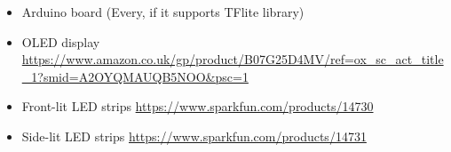 \documentclass{article}
\begin{document}
\begin{itemize}
\item Arduino board (Every, if it supports TFlite library) 
\item OLED display 
        \url{https://www.amazon.co.uk/gp/product/B07G25D4MV/ref=ox_sc_act_title_1?smid=A2OYQMAUQB5NOO&psc=1}
\item Front-lit LED strips 
        \url{https://www.sparkfun.com/products/14730}
\item Side-lit LED strips 
        \url{https://www.sparkfun.com/products/14731}

\end{itemize}
\end{document}

